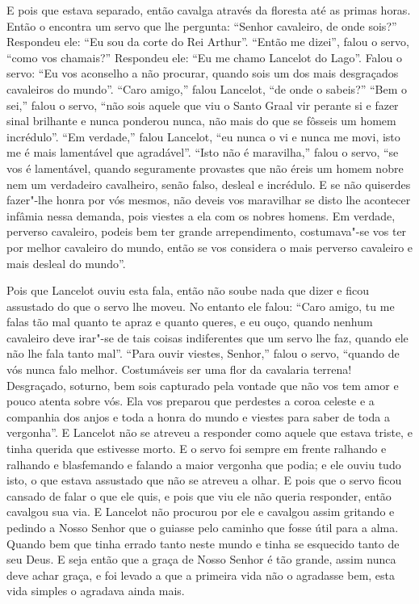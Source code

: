 E pois que estava separado, então cavalga através da floresta até as primas
horas. Então o encontra um servo que lhe pergunta: “Senhor cavaleiro, de onde
sois?” Respondeu ele: “Eu sou da corte do Rei Arthur”. “Então me dizei”, falou
o servo, “como vos chamais?” Respondeu ele: “Eu me chamo Lancelot do Lago”.
Falou o servo: “Eu vos aconselho a não procurar, quando sois um dos mais
desgraçados cavaleiros do mundo”. “Caro amigo,” falou Lancelot, “de onde o
sabeis?” “Bem o sei,” falou o servo, “não sois aquele que viu o Santo Graal
vir perante si e fazer sinal brilhante e nunca ponderou nunca, não mais do que
se fôsseis um homem incrédulo”. “Em verdade,” falou Lancelot, “eu nunca o vi e
nunca me movi, isto me é mais lamentável que agradável”. “Isto não é
maravilha,” falou o servo, “se vos é lamentável, quando seguramente provastes
que não éreis um homem nobre nem um verdadeiro cavalheiro, senão falso, desleal
e incrédulo. E se não quiserdes fazer"-lhe honra por vós mesmos, não deveis vos
maravilhar se disto lhe acontecer infâmia nessa demanda, pois viestes a ela com
os nobres homens. Em verdade, perverso cavaleiro, podeis bem ter grande
arrependimento, costumava"-se vos ter por melhor cavaleiro do mundo, então se
vos considera o mais perverso cavaleiro e mais desleal do mundo”. 

Pois que Lancelot ouviu esta fala, então não soube nada que dizer e ficou
assustado do que o servo lhe moveu. No entanto ele falou: “Caro amigo, tu me
falas tão mal quanto te apraz e quanto queres, e eu ouço, quando nenhum
cavaleiro deve irar"-se de tais coisas indiferentes que um servo lhe faz, quando
ele não lhe fala tanto mal”. “Para ouvir viestes, Senhor,” falou o
servo, “quando de vós nunca falo melhor. Costumáveis ser uma flor da cavalaria
terrena! Desgraçado, soturno, bem sois capturado pela vontade que não vos tem
amor e pouco atenta sobre vós. Ela vos preparou que perdestes a coroa celeste e
a companhia dos anjos e toda a honra do mundo e viestes para saber de toda a
vergonha”. E Lancelot não se atreveu a responder como aquele que estava
triste, e tinha querida que estivesse morto. E o servo foi sempre em frente
ralhando e ralhando e blasfemando e falando a maior vergonha que podia; e ele
ouviu tudo isto, o que estava assustado que não se atreveu a olhar. E pois que
o servo ficou cansado de falar o que ele quis, e pois que viu ele não queria
responder, então cavalgou sua via. E Lancelot não procurou por ele e cavalgou
assim gritando e pedindo a Nosso Senhor que o guiasse pelo caminho que fosse
útil para a alma. Quando bem que tinha errado tanto neste mundo e tinha se
esquecido tanto de seu Deus. E seja então que a graça de Nosso Senhor é tão
grande, assim nunca deve achar graça, e foi levado a que a primeira vida não o
agradasse bem, esta vida simples o agradava ainda mais. 

